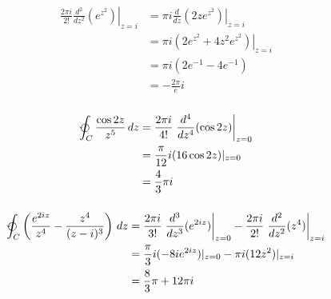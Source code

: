 \documentclass{article}
\begin{document}
\setcounter{subsubsection}{10}
\subsubsection{}

\begin{align*}
  \frac{2 \pi i}{2!} \left. \frac{d^2}{d z^2} (e^{z^2}) \right|_{z = i} & = \pi i \left. \frac{d}{d z} (2 z e^{z^2}) \right|_{z = i} \\
                                                                        & = \pi i \left. (2 e^{z^2} + 4 z^2 e^{z^2}) \right|_{z = i} \\
                                                                        & = \pi i (2 e^{-1} - 4 e^{-1})                              \\
                                                                        & = -\frac{2 \pi}{e} i
\end{align*}

\setcounter{subsubsection}{12}
\subsubsection{}

\begin{align*}
  \varointctrclockwise_C \frac{\cos 2 z}{z^5} \,d z & = \frac{2 \pi i}{4!} \left. \frac{d^4}{d z^4} (\cos 2 z) \right|_{z = 0} \\
                                                    & = \frac{\pi}{12} i (16 \cos 2 z)|_{z = 0}                                \\
                                                    & = \frac{4}{3} \pi i
\end{align*}

\setcounter{subsubsection}{18}
\subsubsection{}

\begin{align*}
  \varointctrclockwise_C \left( \frac{e^{2 i z}}{z^4} - \frac{z^4}{(z - i)^3} \right) \,d z & = \frac{2 \pi i}{3!} \left. \frac{d^3}{d z^3} (e^{2 i z}) \right|_{z = 0} - \frac{2 \pi i}{2!} \left. \frac{d^2}{d z^2} (z^4) \right|_{z = i} \\
                                                                                            & = \frac{\pi}{3} i (-8 i e^{2 i z})|_{z = 0} - \pi i (12 z^2)|_{z = i}                                                                         \\
                                                                                            & = \frac{8}{3} \pi + 12 \pi i
\end{align*}
\end{document}
